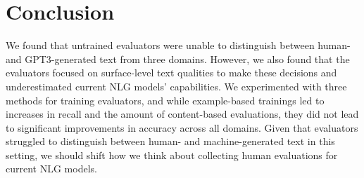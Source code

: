 \section{Conclusion}
We found that untrained evaluators were unable to distinguish between human- and GPT3-generated text from three domains. However, we also found that the evaluators focused on surface-level text qualities to make these decisions and underestimated current NLG models' capabilities.
We experimented with three methods for training evaluators, and while example-based trainings led to increases in recall and the amount of content-based evaluations, they did not lead to significant improvements in accuracy across all domains.
Given that evaluators struggled to distinguish between human- and machine-generated text in this setting, we should shift how we think about collecting human evaluations for current NLG models.